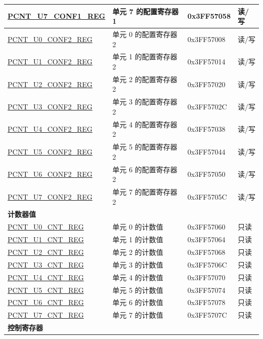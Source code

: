 \begin{longtable}{ | l| l | l|l| }
\hyperref[regdesc:PCNTUnCONF1REG]{PCNT\_U7\_CONF1\_REG} & 单元 7 的配置寄存器 1 & 0x3FF57058 & 读/写 \\ \hline
\hyperref[regdesc:PCNTUnCONF2REG]{PCNT\_U0\_CONF2\_REG} & 单元 0 的配置寄存器 2 & 0x3FF57008 & 读/写 \\ \hline
\hyperref[regdesc:PCNTUnCONF2REG]{PCNT\_U1\_CONF2\_REG} & 单元 1 的配置寄存器 2 & 0x3FF57014 & 读/写 \\ \hline
\hyperref[regdesc:PCNTUnCONF2REG]{PCNT\_U2\_CONF2\_REG} & 单元 2 的配置寄存器 2 & 0x3FF57020 & 读/写 \\ \hline
\hyperref[regdesc:PCNTUnCONF2REG]{PCNT\_U3\_CONF2\_REG} & 单元 3 的配置寄存器 2 & 0x3FF5702C & 读/写 \\ \hline
\hyperref[regdesc:PCNTUnCONF2REG]{PCNT\_U4\_CONF2\_REG} & 单元 4 的配置寄存器 2 & 0x3FF57038 & 读/写 \\ \hline
\hyperref[regdesc:PCNTUnCONF2REG]{PCNT\_U5\_CONF2\_REG} & 单元 5 的配置寄存器 2 & 0x3FF57044 & 读/写 \\ \hline
\hyperref[regdesc:PCNTUnCONF2REG]{PCNT\_U6\_CONF2\_REG} & 单元 6 的配置寄存器 2 & 0x3FF57050 & 读/写 \\ \hline
\hyperref[regdesc:PCNTUnCONF2REG]{PCNT\_U7\_CONF2\_REG} & 单元 7 的配置寄存器 2 & 0x3FF5705C & 读/写 \\ \hline
\multicolumn{4}{|l|}{\textbf{计数器值}} \\ \hline
\hyperref[regdesc:PCNTUnCNTREG]{PCNT\_U0\_CNT\_REG} & 单元 0 的计数值 & 0x3FF57060 & 只读 \\ \hline
\hyperref[regdesc:PCNTUnCNTREG]{PCNT\_U1\_CNT\_REG} & 单元 1 的计数值 & 0x3FF57064 & 只读 \\ \hline
\hyperref[regdesc:PCNTUnCNTREG]{PCNT\_U2\_CNT\_REG} & 单元 2 的计数值 & 0x3FF57068 & 只读 \\ \hline
\hyperref[regdesc:PCNTUnCNTREG]{PCNT\_U3\_CNT\_REG} & 单元 3 的计数值 & 0x3FF5706C & 只读 \\ \hline
\hyperref[regdesc:PCNTUnCNTREG]{PCNT\_U4\_CNT\_REG} & 单元 4 的计数值 & 0x3FF57070 & 只读 \\ \hline
\hyperref[regdesc:PCNTUnCNTREG]{PCNT\_U5\_CNT\_REG} & 单元 5 的计数值 & 0x3FF57074 & 只读 \\ \hline
\hyperref[regdesc:PCNTUnCNTREG]{PCNT\_U6\_CNT\_REG} & 单元 6 的计数值 & 0x3FF57078 & 只读 \\ \hline
\hyperref[regdesc:PCNTUnCNTREG]{PCNT\_U7\_CNT\_REG} & 单元 7 的计数值 & 0x3FF5707C & 只读 \\ \hline
\multicolumn{4}{|l|}{\textbf{控制寄存器}} \\ \hline

\end{longtable}
